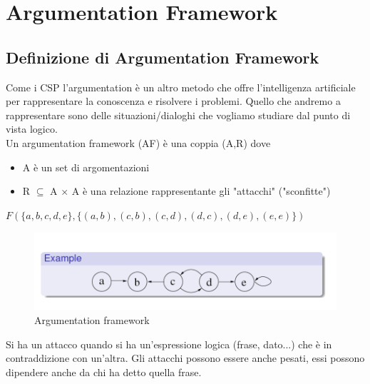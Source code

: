 \chapter{Argumentation Framework} \label{ch:Argumentation Framework}
\section{Definizione di Argumentation Framework}
Come i CSP l'argumentation è un altro metodo che offre l'intelligenza
artificiale per rappresentare la conoscenza e risolvere i problemi. Quello che
andremo a rappresentare sono delle situazioni/dialoghi che vogliamo studiare dal
punto di vista logico.\\
Un argumentation framework (AF) è una coppia (A,R) dove
\begin{itemize}
    \item A è un set di argomentazioni
    \item R $\subseteq$ A $\times$ A è una relazione rappresentante gli "attacchi"
          ("sconfitte")
\end{itemize}
\begin{center}
    $F(\{a,b,c,d,e\}, \{(a,b),(c,b),(c,d),(d,c),(d,e),(e,e)\})$
\end{center}
\begin{figure}[H]
    \centering
    \includegraphics[width=12cm, keepaspectratio]{capitoli/img/Cap6/arg1.png}
    \caption{Argumentation framework}
\end{figure}

Si ha un attacco quando si ha un'espressione logica (frase, dato...) che è in
contraddizione con un'altra. Gli attacchi possono essere anche pesati, essi
possono dipendere anche da chi ha detto quella frase.

